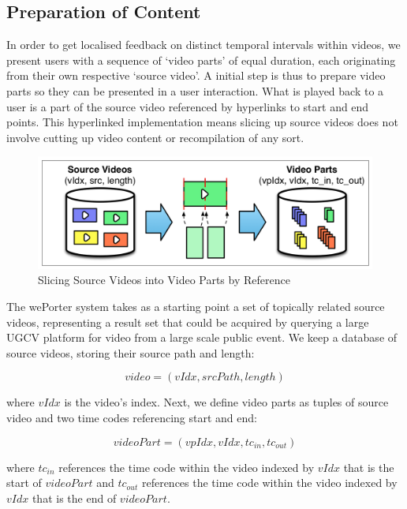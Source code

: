 \subsection{Preparation of Content}

In order to get localised feedback on distinct temporal intervals within videos, we present users with a sequence of `video parts' of equal duration, each originating from their own respective `source video'. A initial step is thus to prepare video parts so they can be presented in a user interaction. What is played back to a user is a part of the source video referenced by hyperlinks to start and end points. This hyperlinked implementation means slicing up source videos does not involve cutting up video content or recompilation of any sort. 

\begin{figure}[htbp]
  \centering
    \includegraphics[width=.7\textwidth]{img/preparing_content}
  \caption{Slicing Source Videos into Video Parts by Reference}
  \label{fig:content}
\end{figure}

The wePorter system takes as a starting point a set of topically related source videos, representing a result set that could be acquired by querying a large UGCV platform for video from a large scale public event. We keep a database of source videos, storing their source path and length:

\begin{equation}
  video = (vIdx, srcPath, length)
\end{equation}

where $vIdx$ is the video's index. Next, we define video parts as tuples of source video and two time codes referencing start and end:

\begin{equation}
  videoPart = (vpIdx, vIdx, tc_{in}, tc_{out})
\end{equation}

where $tc_{in}$ references the time code within the video indexed by $vIdx$ that is the start of $videoPart$ and $tc_{out}$ references the time code within the video indexed by $vIdx$ that is the end of $videoPart$. 

